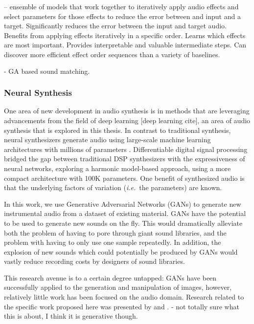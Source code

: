 \cite{mitcheltree2021serumrnn} -- ensemble of models that work together to iteratively apply audio effects and select parameters for those effects to reduce the error between and input and a target. Significantly reduces the error between the input and target audio. Benefits from applying effects iteratively in a specific order. Learns which effects are most important. Provides interpretable and valuable intermediate steps. Can discover more efficient effect order sequences than a variety of baselines.

\cite{masudo2021quality} - GA based sound matching.


\subsubsection{Neural Synthesis}
One area of new development in audio synthesis is in methods that are leveraging advancements from the field of deep learning [deep learning cite], an area of audio synthesis that is explored in this thesis.  
In contrast to traditional synthesis, neural synthesizers generate audio using large-scale machine learning architectures with millions of parameters \cite{engel2017neural}. Differentiable digital signal processing \cite{engel2020ddsp} bridged the gap between traditional DSP synthesizers with the expressiveness of neural networks, exploring a harmonic model-based approach, using a more compact architecture with 100K parameters.
One benefit of synthesized audio is that the underlying factors of variation ({\em i.e.}~the parameters) are known.

In this work, we use Generative Adversarial Networks (GANs) \cite{goodfellow2014generative} to generate new instrumental audio from a dataset of existing material. GANs have the potential to be used to generate new sounds on the fly. This would dramatically alleviate both the problem of having to pore through giant sound libraries, and the problem with having to only use one sample repeatedly. In addition, the explosion of new sounds which could potentially be produced by GANs would vastly reduce recording costs by designers of sound libraries.

This research avenue is to a certain degree untapped: GANs have been successfully applied to the generation and manipulation of images, however, relatively little work has been focused on the audio domain. Research related to the specific work proposed here was presented by \cite{donahue2018adversarial}  and \cite{engel2018gansynth}.
\cite{ccakir2018musical} - not totally sure what this is about, I think it is generative though.

